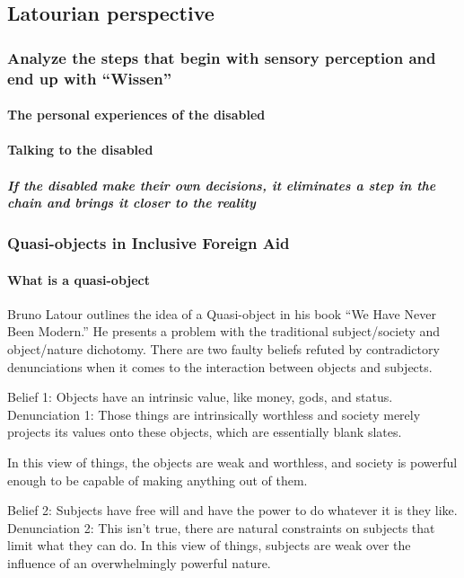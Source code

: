 \documentclass{lps}
\begin{document}
\subsection{Latourian perspective}

\subsubsection{Analyze the steps that begin with sensory perception and end up
with “Wissen”}

\paragraph{The personal experiences of the disabled}

\paragraph{Talking to the disabled}

\subparagraph{If the disabled make their own decisions, it eliminates a step
in the chain and brings it closer to the reality}

\subsubsection{Quasi-objects in Inclusive Foreign Aid}
\paragraph{What is a quasi-object}
Bruno Latour outlines the idea of a Quasi-object in his book “We Have Never Been Modern.” He presents a problem with the traditional subject/society and object/nature dichotomy. There are two faulty beliefs refuted by contradictory denunciations when it comes to the interaction between objects and subjects. 

Belief 1: Objects have an intrinsic value, like money, gods, and status. 
Denunciation 1: Those things are intrinsically worthless and society merely projects its values onto these objects, which are essentially blank slates.

In this view of things, the objects are weak and worthless, and society is powerful enough to be capable of making anything out of them.

Belief 2: Subjects have free will and have the power to do whatever it is they like.
Denunciation 2: This isn’t true, there are natural constraints on subjects that limit what they can do.
In this view of things, subjects are weak over the influence of an overwhelmingly powerful nature.
\end{document}
